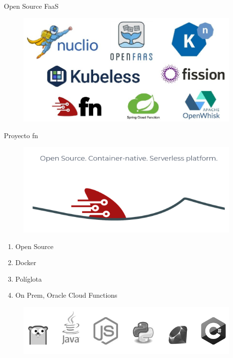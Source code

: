 \documentclass[aspectratio=169]{beamer}
\begin{document}
\begin{frame}{Open Source FaaS}
\begin{figure}
	\centering
	\includegraphics[width=0.9\linewidth]{Images/open-faas.png}
	\label{fig:faas}
\end{figure}
\end{frame}

\begin{frame}{Proyecto fn}
\begin{figure}
	\centering
	\includegraphics[width=0.5\linewidth]{Images/fn.png}
\end{figure}

\begin{enumerate}
        \item Open Source
        \item Docker
        \item Políglota
        \item On Prem, Oracle Cloud Functions
\end{enumerate}

\begin{figure}
	\centering
	\includegraphics[width=0.5\linewidth]{Images/langs.png}
\end{figure}
\end{frame}
\end{document}

